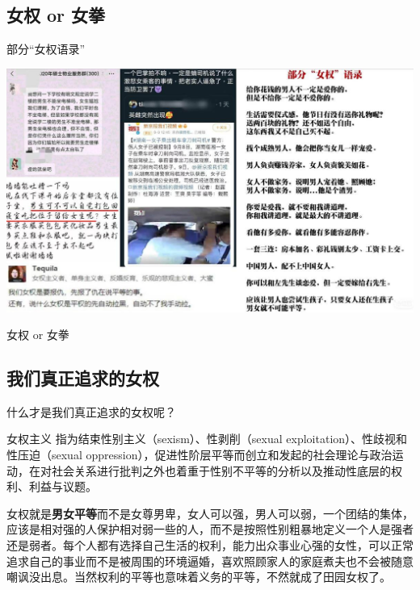 \subsection{女权 or 女拳}
\begin{frame}{部分“女权语录”}
    \begin{block}{}
        \begin{center}
            \includegraphics[width=.85\textwidth]{../docs/img/4-7.jpg}
        \end{center}
    \end{block}
\end{frame}

\begin{frame}{女权 or 女拳}
    \begin{center}
    \end{center}
\end{frame}



\subsection{我们真正追求的女权}
\begin{frame}{什么才是我们真正追求的女权呢？}
    \begin{block}{女权主义}
        指为结束性别主义（sexism）、性剥削（sexual exploitation）、性歧视和性压迫（sexual oppression），促进性阶层平等而创立和发起的社会理论与政治运动，在对社会关系进行批判之外也着重于性别不平等的分析以及推动性底层的权利、利益与议题。
    \end{block}
    \begin{block}{}
        女权就是\textbf{男女平等}而不是女尊男卑，女人可以强，男人可以弱，一个团结的集体，应该是相对强的人保护相对弱一些的人，而不是按照性别粗暴地定义一个人是强者还是弱者。每个人都有选择自己生活的权利，能力出众事业心强的女性，可以正常追求自己的事业而不是被周围的环境逼婚，喜欢照顾家人的家庭煮夫也不会被随意嘲讽没出息。当然权利的平等也意味着义务的平等，不然就成了田园女权了。
    \end{block}
\end{frame}

